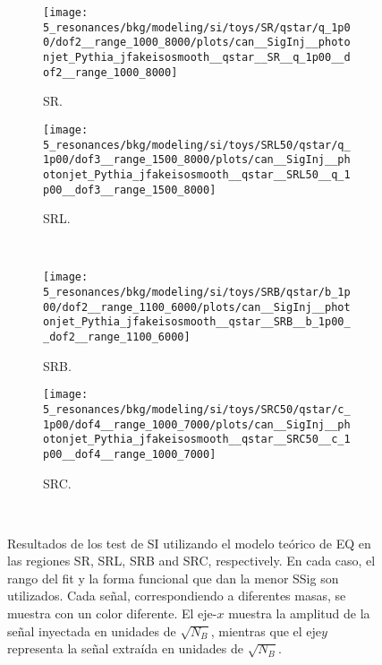 \begin{figure}[ht!]
    \centering
    \begin{subfigure}[h]{0.49\linewidth}
        \centering
        \texttt{[image: 5\_resonances/bkg/modeling/si/toys/SR/qstar/q\_1p00/dof2\_\_range\_1000\_8000/plots/can\_\_SigInj\_\_photonjet\_Pythia\_jfakeisosmooth\_\_qstar\_\_SR\_\_q\_1p00\_\_dof2\_\_range\_1000\_8000]}
        \caption{SR.}
    \end{subfigure}
    \hfill
    \begin{subfigure}[h]{0.49\linewidth}
        \centering
        \texttt{[image: 5\_resonances/bkg/modeling/si/toys/SRL50/qstar/q\_1p00/dof3\_\_range\_1500\_8000/plots/can\_\_SigInj\_\_photonjet\_Pythia\_jfakeisosmooth\_\_qstar\_\_SRL50\_\_q\_1p00\_\_dof3\_\_range\_1500\_8000]}
        \caption{SRL.}
    \end{subfigure}\\
    \begin{subfigure}[h]{0.49\linewidth}
        \centering
        \texttt{[image: 5\_resonances/bkg/modeling/si/toys/SRB/qstar/b\_1p00/dof2\_\_range\_1100\_6000/plots/can\_\_SigInj\_\_photonjet\_Pythia\_jfakeisosmooth\_\_qstar\_\_SRB\_\_b\_1p00\_\_dof2\_\_range\_1100\_6000]}
        \caption{SRB.}
    \end{subfigure}
    \hfill
    \begin{subfigure}[h]{0.49\linewidth}
        \centering
        \texttt{[image: 5\_resonances/bkg/modeling/si/toys/SRC50/qstar/c\_1p00/dof4\_\_range\_1000\_7000/plots/can\_\_SigInj\_\_photonjet\_Pythia\_jfakeisosmooth\_\_qstar\_\_SRC50\_\_c\_1p00\_\_dof4\_\_range\_1000\_7000]}
        \caption{SRC.}
    \end{subfigure}\\
    \caption{Resultados de los test de \ac{SI} utilizando el modelo teórico de \ac{EQ} en las regiones SR, SRL, SRB and SRC, respectively. En cada caso, el rango del fit y la forma funcional que dan la menor \ac{SSig} son utilizados. Cada se\~nal, correspondiendo a diferentes masas, se muestra con un color diferente. El eje-\(x\) muestra la amplitud de la se\~nal inyectada en unidades de \(\sqrt{N_B}\), mientras que el eje\(y\) representa la se\~nal extraída en unidades de \(\sqrt{N_B}\).}
    \label{fig:bkg:modeling:sigbkg:sitest:siginj_qstar}
\end{figure}































